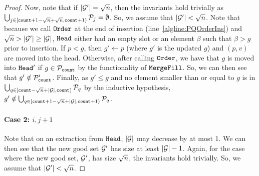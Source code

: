 \begin{proof}
Now, note that if $|\mathcal{G}'| = {\sqrt{n}}$, then the invariants hold trivially as $\bigcup_{j \in [{\texttt{count}} + 1 - {\sqrt{n}} + {\sqrt{n}}, {\texttt{count}} + 1)} \mathcal{P}_j = \emptyset$.  %
So, we assume that $|\mathcal{G}'| < {\sqrt{n}}$. Note that because we call $\texttt{Order}$ at the end of insertion (line~\ref{algline:PQOrderIns})
and ${\sqrt{n}} > |\mathcal{G}'| \geq |\mathcal{G}|$, $\texttt{Head}$ either had an empty slot or an element $\beta$ such that $\beta > g$ prior to insertion.
If $p < g$, then $g' \gets p$ (where $g'$ is the updated $g$) and $(p, v)$ are moved into the head.
Otherwise, after calling $\texttt{Order}$, we have that $g$ is moved into $\texttt{Head}'$ if $g \in \mathcal{P}_{\texttt{count}}$ by the functionality of $\texttt{MergeFill}$.
So, we can then see that $g' \notin \mathcal{P}'_{\texttt{count}}$.
Finally, as $g' \leq g$ and no element smaller than or equal to $g$ is in $\bigcup_{q \in [{\texttt{count}} - {\sqrt{n}} + |\mathcal{G}|, {\texttt{count}})} \mathcal{P}_q$ by the inductive hypothesis,
$g' \notin \bigcup_{q \in [{\texttt{count}} + 1 - {\sqrt{n}} + |\mathcal{G}|, {\texttt{count}} + 1)} \mathcal{P}_q$.\\

\paragraph*{Case 2: $i, j + 1$} Note that on an extraction from $\texttt{Head}$, $|\mathcal{G}|$ may decrease by at most 1.
We can then see that the new good set $\mathcal{G}'$ has size at least $|\mathcal{G}| - 1$.
Again, for the case where the new good set, $\mathcal{G}'$, has size ${\sqrt{n}}$, the invariants hold trivially.
So, we assume that $|\mathcal{G}'| < {\sqrt{n}}$.


\end{proof}
